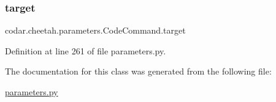 \subsubsection{\texorpdfstring{target}{target}}
{\footnotesize\ttfamily codar.\+cheetah.\+parameters.\+Code\+Command.\+target}



Definition at line 261 of file parameters.\+py.



The documentation for this class was generated from the following file\+:\begin{DoxyCompactItemize}
\item 
\hyperlink{parameters_8py}{parameters.\+py}\end{DoxyCompactItemize}
